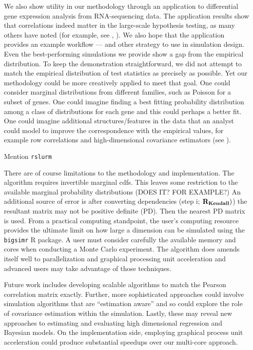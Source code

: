 \documentclass[
]{article}
\begin{document}
We also show utility in our methodology through an application to differential gene expression analysis from RNA-sequencing data. The application results show that correlations indeed matter in the large-scale hypothesis testing, as many others have noted (for example, see \citet{BE07}, \citet{Wu2012b}). We also hope that the application provides an example workflow --- and other strategy to use in simulation design. Even the best-performing simulations we provide show a gap from the empirical distribution. To keep the demonstration straightforward, we did not attempt to match the empirical distribution of test statistics as precisely as possible. Yet our methodology could be more creatively applied to meet that goal. One could consider marginal distributions from different families, such as Poisson for a subset of genes. One could imagine finding a best fitting probability distribution among a class of distributions for each gene and this could perhaps a better fit. One could imagine additional structures/features in the data that an analyst could model to improve the correspondence with the empirical values, for example row correlations and high-dimensional covariance estimators (see \citet{Won2013g}).

Mention \texttt{rslurm}

There are of course limitations to the methodology and implementation. The algorithm requires invertible marginal cdfs. This leaves some restriction to the available marginal probability distributions (DOES IT? FOR EXAMPLE?) An additional source of error is after converting dependencies (step i; \({\bf R_{Kendall}})\)) the resultant matrix may not be positive definite (PD). Then the nearest PD matrix is used. From a practical computing standpoint, the user's computing resource provides the ultimate limit on how large a dimension can be simulated using the \texttt{bigsimr} R package. A user must consider carefully the available memory and cores when conducting a Monte Carlo experiment. The algorithm does amends itself well to parallelization and graphical processing unit acceleration \citep{Li2019gpu} and advanced users may take advantage of those techniques.

Future work includes developing scalable algorithms to match the Pearson correlation matrix exactly. Further, more sophisticated approaches could involve simulation algorithms that are ``estimation aware'' and so could explore the role of covariance estimation within the simulation. Lastly, these may reveal new approaches to estimating and evaluating high dimensional regression and Bayesian models. On the implementation side, employing graphical process unit acceleration could produce substantial speedups over our multi-core approach.
\end{document}

